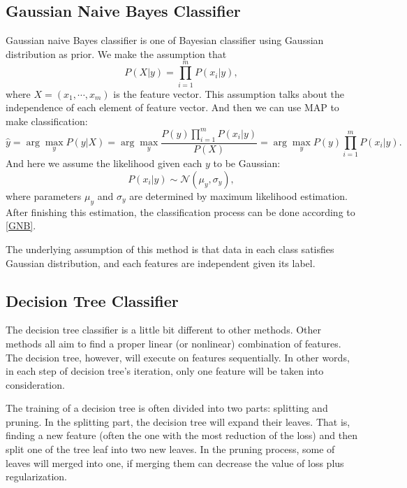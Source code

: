 \documentclass[english]{article}
\begin{document}
\subsection{Gaussian Naive Bayes Classifier}
\par Gaussian naive Bayes classifier is one of Bayesian classifier using Gaussian distribution as prior. We make the assumption that
\begin{equation}
	P(X|y) = \prod_{i=1}^{m}P(x_{i}|y),
\end{equation}
where $X = (x_{1}, \cdots, x_{m})$ is the feature vector. This assumption talks about the independence of each element of feature vector. And then we can use MAP to make classification:
\begin{equation}\label{GNB}
	\hat{y} = \arg\max_{y}P(y|X) = \arg\max_{y}\frac{P(y)\prod_{i=1}^{m}P(x_{i}|y)}{P(X)} = \arg\max_{y}P(y)\prod_{i=1}^{m}P(x_{i}|y).
\end{equation}
And here we assume the likelihood given each $y$ to be Gaussian:
\begin{equation}
	P(x_{i}|y)\sim\mathcal{N}(\mu_{y}, \sigma_{y}),
\end{equation}
where parameters $\mu_{y}$ and $\sigma_{y}$ are determined by maximum likelihood estimation. After finishing this estimation, the classification process can be done according to \eqref{GNB}.
\par The underlying assumption of this method is that data in each class satisfies Gaussian distribution, and each features are independent given its label.

\subsection{Decision Tree Classifier}
\par The decision tree classifier is a little bit different to other methods. Other methods all aim to find a proper linear (or nonlinear) combination of features. The decision tree, however, will execute on features sequentially. In other words, in each step of decision tree's iteration, only one feature will be taken into consideration.
\par The training of a decision tree is often divided into two parts: splitting and pruning. In the splitting part, the decision tree will expand their leaves. That is, finding a new feature (often the one with the most reduction of the loss) and then split one of the tree leaf into two new leaves. In the pruning process, some of leaves will merged into one, if merging them can decrease the value of loss plus regularization.
\end{document}
